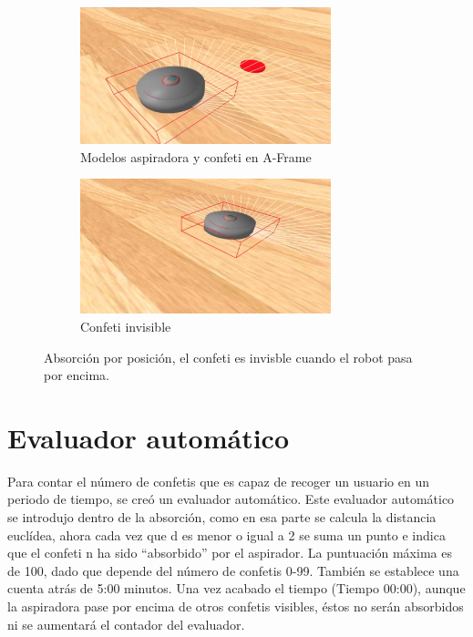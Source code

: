 \begin{figure}[H]
  \begin{subfigure}[b]{0.5\textwidth}
  \centering
    \includegraphics[width=0.8\textwidth, height=0.5\textwidth]{chapters/images/prototiporoomba.png}
    \caption{Modelos aspiradora y confeti en A-Frame}
    \label{fig:f1}
  \end{subfigure}
  \hfill
  \begin{subfigure}[b]{0.5\textwidth}
  \centering
    \includegraphics[width=0.8\textwidth, height=0.5\textwidth]{chapters/images/prototiporoomba2.png}
	\caption{Confeti invisible}    
    \label{fig:f2}
 
  \end{subfigure}
  \caption{Absorción por posición, el confeti es invisble cuando el robot pasa por encima.}
\end{figure}


\section{Evaluador automático}
Para contar el número de confetis que es capaz de recoger un usuario en un periodo de tiempo, se creó un evaluador automático. Este evaluador automático se introdujo dentro de la absorción, como en esa parte se calcula la distancia euclídea, ahora cada vez que d es menor o igual a 2 se suma un punto e indica que el confeti n ha sido  ``absorbido'' por el aspirador. La puntuación máxima es de 100, dado que depende del número de confetis 0-99. También se establece una cuenta atrás de 5:00 minutos. Una vez acabado el tiempo (Tiempo 00:00), aunque la aspiradora pase por encima de otros confetis visibles, éstos no serán absorbidos ni se aumentará el contador del evaluador.


